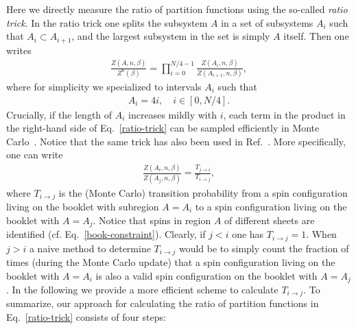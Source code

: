 \documentclass[twocolumn,superscriptaddress,prb,10pt]{revtex4-1}
\begin{document}
Here we directly measure the ratio of partition functions using the so-called \emph{ratio trick}. In 
the ratio trick one splits the subsystem $A$ in a set of subsystems $A_i$
such that $A_i\subset A_{i+1}$, and the largest subsystem in the set is simply $A$ itself. Then one writes 
%
\begin{align}
\label{ratio-trick}
\frac{Z(A,n,\beta)}{ Z^n(\beta)} = \prod_{i=0}^{N/4-1} \frac{Z(A_i,n,\beta)}{Z(A_{i+1},n,\beta)},
\end{align}
%
where for simplicity we specialized to intervals $A_i$ such that
%
\begin{align}
\label{sub-choice}
A_i = 4i,\quad i \in [0,N/4].
\end{align}
%
Crucially, if the length of $A_i$ increases mildly with $i$, each term in the product 
in the right-hand side of Eq.~\eqref{ratio-trick} can be sampled efficiently in Monte 
Carlo~\cite{stephan-2014}. Notice that the same trick has also been used in 
Ref.~. More specifically, one can write
%
\begin{align}
\frac{Z(A_i,n,\beta)}{Z(A_{j},n,\beta)} = \frac{T_{j\rightarrow i}}{T_{i\rightarrow j}}, 
\end{align}
%
where $T_{i\rightarrow j}$  is the (Monte Carlo) transition probability from a spin 
configuration living on the booklet with subregion $A=A_i$ to a spin configuration living 
on the booklet with $A=A_j$. Notice that spins in region $A$ of different sheets are 
identified (cf. Eq.~\eqref{book-constraint}). Clearly, if $j<i$ one has $T_{i\rightarrow j}=1$.
When $j>i$ a naive method to determine $T_{i\rightarrow j}$ would be to simply count the 
fraction of times (during the Monte Carlo update) that a spin configuration living on 
the booklet with $A=A_i$ is also a valid spin configuration on the booklet with $A=A_j$.
In the following we provide a more efficient scheme to calculate $T_{i\rightarrow j}$.
To summarize, our approach for calculating the ratio of partition functions in 
Eq.~\eqref{ratio-trick} consists of four steps:
%
\end{document}
